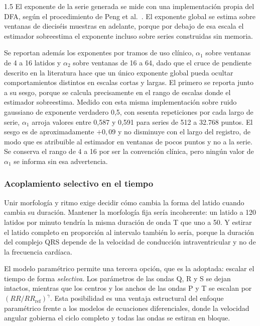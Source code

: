 \begin{spacing}{1.5}
El exponente de la serie generada se mide con una implementación propia del DFA,
según el procedimiento de Peng et al.\ \cite{peng1995quantification}. El
exponente global se estima sobre ventanas de dieciséis muestras en adelante,
porque por debajo de esa escala el estimador sobreestima el exponente incluso
sobre series construidas sin memoria.

Se reportan además los exponentes por tramos de uso clínico, $\alpha_1$ sobre
ventanas de 4 a 16 latidos y $\alpha_2$ sobre ventanas de 16 a 64, dado que el
cruce de pendiente descrito en la literatura hace que un único exponente global
pueda ocultar comportamientos distintos en escalas cortas y largas. El primero
se reporta junto a su sesgo, porque se calcula precisamente en el rango de
escalas donde el estimador sobreestima. Medido con esta misma implementación
sobre ruido gaussiano de exponente verdadero 0,5, con sesenta repeticiones por
cada largo de serie, $\alpha_1$ arroja valores entre 0,587 y 0,591 para series
de 512 a 32.768 puntos. El sesgo es de aproximadamente $+0{,}09$ y no disminuye
con el largo del registro, de modo que es atribuible al estimador en ventanas de
pocos puntos y no a la serie. Se conserva el rango de 4 a 16 por ser la
convención clínica, pero ningún valor de $\alpha_1$ se informa sin esa
advertencia.

\subsubsection{Acoplamiento selectivo en el tiempo}

Unir morfología y ritmo exige decidir cómo cambia la forma del latido cuando
cambia su duración. Mantener la morfología fija sería incoherente: un latido a
120 latidos por minuto tendría la misma duración de onda T que uno a 50. Y
estirar el latido completo en proporción al intervalo también lo sería, porque
la duración del complejo QRS depende de la velocidad de conducción
intraventricular y no de la frecuencia cardíaca.

El modelo paramétrico permite una tercera opción, que es la adoptada: escalar el
tiempo de forma \emph{selectiva}. Los parámetros de las ondas Q, R y S se dejan
intactos, mientras que los centros y los anchos de las ondas P y T se escalan
por $(RR/RR_{\text{ref}})^{\gamma}$. Esta posibilidad es una ventaja estructural
del enfoque paramétrico frente a los modelos de ecuaciones diferenciales, donde
la velocidad angular gobierna el ciclo completo y todas las ondas se estiran en
bloque.


\end{spacing}
